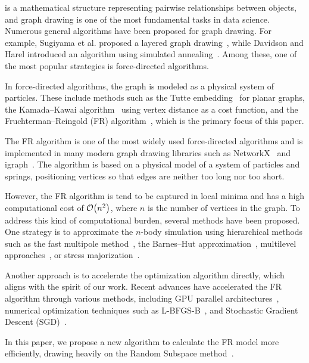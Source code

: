 \documentclass[journal]{IEEEtran}
\begin{document}
 is a mathematical structure representing pairwise relationships between objects, and graph drawing is one of the most fundamental tasks in data science. Numerous general algorithms have been proposed for graph drawing. For example, Sugiyama et al. proposed a layered graph drawing~\cite{sugiyamaMethodsVisualUnderstanding1981}, while Davidson and Harel introduced an algorithm using simulated annealing~\cite{davidson1996drawing}. Among these, one of the most popular strategies is force-directed algorithms.

In force-directed algorithms, the graph is modeled as a physical system of particles. These include methods such as the Tutte embedding~\cite{tutteHowDrawGraph1963} for planar graphs, the Kamada--Kawai algorithm~\cite{kamadaAlgorithmDrawingGeneral1989} using vertex distance as a cost function, and the Fruchterman--Reingold (FR) algorithm~\cite{fruchtermanGraphDrawingForcedirected1991}, which is the primary focus of this paper.

The FR algorithm is one of the most widely used force-directed algorithms and is implemented in many modern graph drawing libraries such as NetworkX~\cite{osti_960616} and igraph~\cite{csardiIgraphSoftwarePackage2006}. The algorithm is based on a physical model of a system of particles and springs, positioning vertices so that edges are neither too long nor too short.

However, the FR algorithm is tend to be captured in local minima and has a high computational cost of $\order{n^2}$, where $n$ is the number of vertices in the graph. To address this kind of computational burden, several methods have been proposed. One strategy is to approximate the $n$-body simulation using hierarchical methods such as the fast multipole method~\cite{greengardFastAlgorithmParticle1987}, the Barnes--Hut approximation~\cite{barnesHierarchicalLogForcecalculation1986}, multilevel approaches~\cite{Hu2006EfficientHF}, or stress majorization~\cite{gansnerGraphDrawingStress2005}.

Another approach is to accelerate the optimization algorithm directly, which aligns with the spirit of our work. Recent advances have accelerated the FR algorithm through various methods, including GPU parallel architectures~\cite{gajdosParallelFruchtermanReingold2016}, numerical optimization techniques such as L-BFGS-B~\cite{6183577}, and Stochastic Gradient Descent (SGD)~\cite{8419285}.

In this paper, we propose a new algorithm to calculate the FR model more efficiently, drawing heavily on the Random Subspace method~\cite{NEURIPS2019_bc6dc48b,fujiRandomizedSubspaceRegularized2022,cartisRandomisedSubspaceMethods2022,higuchiFastConvergenceSecondOrder2024}.
\end{document}
